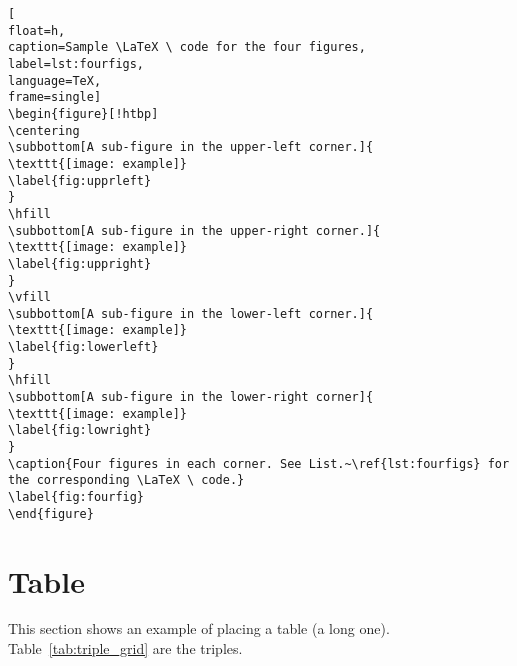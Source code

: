 \begin{lstlisting}[
float=h,
caption=Sample \LaTeX \ code for the four figures, 
label=lst:fourfigs,
language=TeX,
frame=single]
\begin{figure}[!htbp]
\centering
\subbottom[A sub-figure in the upper-left corner.]{
\texttt{[image: example]}
\label{fig:upprleft}
}
\hfill
\subbottom[A sub-figure in the upper-right corner.]{
\texttt{[image: example]}
\label{fig:uppright}
}
\vfill
\subbottom[A sub-figure in the lower-left corner.]{
\texttt{[image: example]}
\label{fig:lowerleft}
}
\hfill
\subbottom[A sub-figure in the lower-right corner]{
\texttt{[image: example]}
\label{fig:lowright}
}
\caption{Four figures in each corner. See List.~\ref{lst:fourfigs} for the corresponding \LaTeX \ code.} 
\label{fig:fourfig}
\end{figure}
\end{lstlisting}
\cleardoublepage





\newpage
\section{Table}

This section shows an example of placing a table (a long one). Table~\ref{tab:triple_grid} are the triples. 


